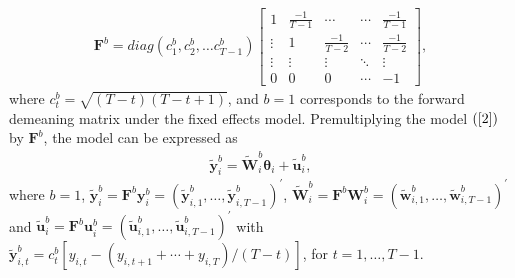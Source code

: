 \documentclass[12pt,a4paper,hyperref]{article}
\begin{document}
\begin{align}
\boldsymbol{F}^{b}=diag(c^{b}_{1}, c^{b}_{2}, \ldots c^{b}_{T-1})
\begin{bmatrix}
1 & \frac{-1}{T-1} & \cdots & \cdots & \frac{-1}{T-1}\\
\vdots & 1 & \frac{-1}{T-2} & \cdots & \frac{-1}{T-2}\\
\vdots & \vdots & \vdots & \ddots & \vdots \\
0 & 0 & 0 & \cdots & -1
\end{bmatrix},
\end{align}
where $c^{b}_{t}=\sqrt{\left( T-t\right)\left( T-t+1\right) }$, and  $b=1$ corresponds to the forward demeaning matrix under the fixed effects model.
Premultiplying the model $(\ref{2})$ by $\boldsymbol{F}^{b}$, the model can be expressed as
\begin{align}
\tilde{\boldsymbol{y}}^{b}_{i}= \tilde{\boldsymbol{W}}^{b}_{i}\boldsymbol{\theta}_{i}+\tilde{\boldsymbol{u}}^{b}_{i}, \label{4}
\end{align}
where $b=1$, $\tilde{\boldsymbol{y}}^{b}_{i}=\boldsymbol{F}^{b}\boldsymbol{y}^{b}_{i}= \left(\tilde{\boldsymbol{y}}^{b}_{i,1}, \ldots, \tilde{\boldsymbol{y}}^{b}_{i,T-1} \right)^{'}$,  $\tilde{\boldsymbol{W}}^{b}_{i}=\boldsymbol{F}^{b}\boldsymbol{W}^{b}_{i}= \left(\tilde{\boldsymbol{w}}^{b}_{i,1}, \ldots, \tilde{\boldsymbol{w}}^{b}_{i,T-1} \right)^{'}$ and $\tilde{\boldsymbol{u}}^{b}_{i}=\boldsymbol{F}^{b}\boldsymbol{u}^{b}_{i}= \left(\tilde{\boldsymbol{u}}^{b}_{i,1}, \ldots, \tilde{\boldsymbol{u}}^{b}_{i,T-1} \right)^{'}$ with $\tilde{\boldsymbol{y}}^{b}_{i,t}=c^{b}_{t}\left[y_{i,t}-\left(y_{i,t+1}+\cdots+y_{i,T} \right)/\left(T-t \right) \right]$, for $t=1, \ldots, T-1.$
\end{document}
